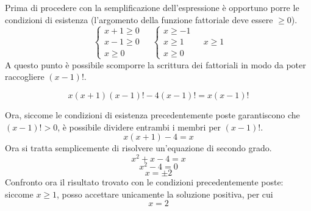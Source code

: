 \documentclass{article}     %
\begin{document}
            \begin{ex}
                
                Prima di procedere con la semplificazione dell'espressione è opportuno porre le condizioni di esistenza (l'argomento della funzione fattoriale deve essere $\geq 0$).
                \[ \left\{
                \begin{array}{c}
                    x+1\geq 0 \\
                    x-1\geq 0 \\
                    x\geq 0
                \end{array} \right. ~~~~~
                \left\{
                \begin{array}{c}
                    x\geq -1 \\
                    x\geq 1 \\
                    x\geq 0
                \end{array} \right. ~~~~~
                x\geq 1
                \]
                A questo punto è possibile scomporre la scrittura dei fattoriali in modo da poter raccogliere $(x-1)!$.
                
                \[x(x+1)(x-1)!-4(x-1)!=x(x-1)!\]
                
                Ora, siccome le condizioni di esistenza precedentemente poste garantiscono che $(x-1)!>0$, è possibile dividere entrambi i membri per $(x-1)!$.
                \[x(x+1)-4=x\]
                Ora si tratta semplicemente di risolvere un'equazione di secondo grado.
                \[x^2+x-4=x\]
                \[x^2-4=0\]
                \[x=\pm2\]
                Confronto ora il risultato trovato con le condizioni precedentemente poste: siccome $x\geq1$, posso accettare unicamente la soluzione positiva, per cui \[x=2\]
            \end{ex}
\end{document}
